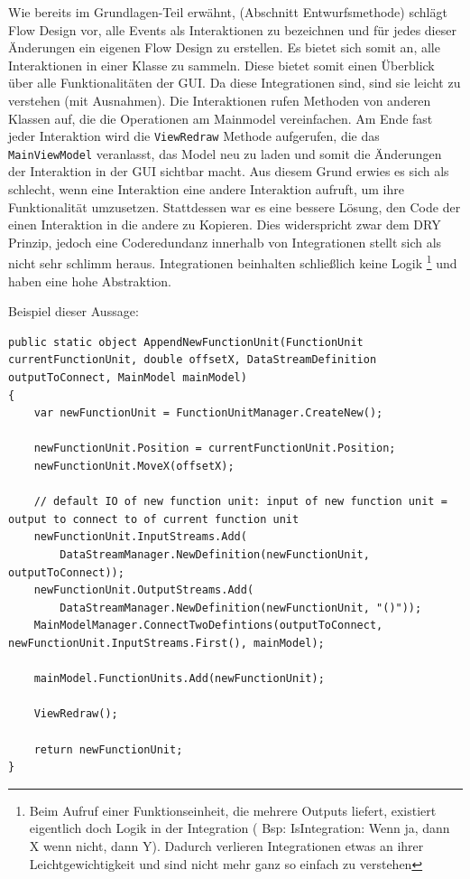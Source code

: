 Wie bereits im Grundlagen-Teil erwähnt, (Abschnitt Entwurfsmethode) schlägt Flow Design
vor, alle Events als Interaktionen zu bezeichnen und für jedes dieser
Änderungen ein eigenen Flow Design zu erstellen. 
Es bietet sich somit an, alle Interaktionen in einer Klasse zu sammeln.
Diese bietet somit einen Überblick über alle Funktionalitäten der GUI.
Da diese Integrationen sind, sind sie leicht zu verstehen (mit Ausnahmen). Die
Interaktionen rufen Methoden von anderen Klassen auf, die die Operationen am
Mainmodel vereinfachen. Am Ende fast jeder Interaktion wird die \texttt{ViewRedraw}
Methode aufgerufen, die das \texttt{MainViewModel} veranlasst, das Model neu zu
laden und somit die Änderungen der Interaktion in der GUI sichtbar macht.
Aus diesem Grund erwies es sich als schlecht, wenn eine Interaktion eine andere
Interaktion aufruft, um ihre Funktionalität umzusetzen. 
Stattdessen war es eine bessere Lösung, den Code der einen Interaktion in
die andere zu Kopieren. Dies widerspricht zwar dem DRY Prinzip, jedoch eine
Coderedundanz innerhalb von Integrationen stellt sich als nicht sehr schlimm
heraus. Integrationen beinhalten schließlich keine Logik \footnote{Beim
Aufruf einer Funktionseinheit, die mehrere Outputs liefert, existiert
eigentlich doch Logik in der Integration ( Bsp: IsIntegration: Wenn ja,
dann X wenn nicht, dann Y). Dadurch verlieren Integrationen etwas an ihrer
Leichtgewichtigkeit und sind nicht mehr ganz so einfach zu verstehen} und haben eine hohe
Abstraktion.

Beispiel dieser Aussage:
\begin{lstlisting}[caption=AppendNewFunctionUnit]
public static object AppendNewFunctionUnit(FunctionUnit currentFunctionUnit, double offsetX, DataStreamDefinition outputToConnect, MainModel mainModel)
{
	var newFunctionUnit = FunctionUnitManager.CreateNew();
	
	newFunctionUnit.Position = currentFunctionUnit.Position;
	newFunctionUnit.MoveX(offsetX);
	
	// default IO of new function unit: input of new function unit = output to connect to of current function unit
	newFunctionUnit.InputStreams.Add(
		DataStreamManager.NewDefinition(newFunctionUnit, outputToConnect));
	newFunctionUnit.OutputStreams.Add(
		DataStreamManager.NewDefinition(newFunctionUnit, "()"));
	MainModelManager.ConnectTwoDefintions(outputToConnect, newFunctionUnit.InputStreams.First(), mainModel);
	
	mainModel.FunctionUnits.Add(newFunctionUnit);
	
	ViewRedraw();
	
	return newFunctionUnit;
}
\end{lstlisting}

